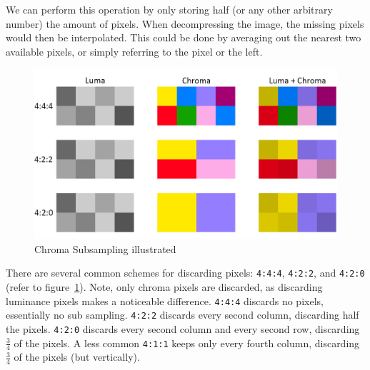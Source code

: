 \documentclass{article}
\begin{document}
We can perform this operation by only storing half (or any other arbitrary number) the amount of pixels.
When decompressing the image, the missing pixels would then be interpolated.
This could be done by averaging out the nearest two available pixels, or simply referring to the pixel or the left.

\begin{figure}
\includegraphics[width=\linewidth]{./figures/subsampling.png}
\caption{Chroma Subsampling illustrated}
\label{fig:subsampling}
\end{figure}

There are several common schemes for discarding pixels: \texttt{4:4:4}, \texttt{4:2:2}, and \texttt{4:2:0} (refer to figure~\ref{fig:subsampling}).
Note, only chroma pixels are discarded, as discarding luminance pixels makes a noticeable difference.
\texttt{4:4:4} discards no pixels, essentially no sub sampling.
\texttt{4:2:2} discards every second column, discarding half the pixels.
\texttt{4:2:0} discards every second column and every second row, discarding $\frac{3}{4}$ of the pixels.
A less common \texttt{4:1:1} keeps only every fourth column, discarding $\frac{3}{4}$ of the pixels (but vertically).
\end{document}
